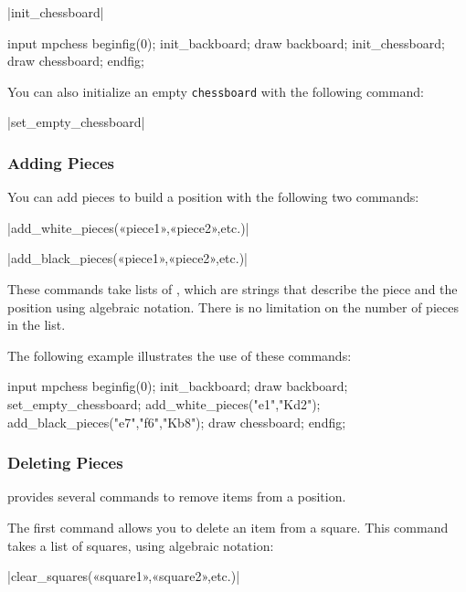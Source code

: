 \documentclass[english]{ltxdoc}
\begin{document}
\commande|init_chessboard|\smallskip

\begin{ExempleMP}
input mpchess
beginfig(0);
init_backboard;
draw backboard;
init_chessboard;
draw chessboard;
endfig;
\end{ExempleMP}

You can also initialize an empty \lstinline+chessboard+ with the following command:

\commande|set_empty_chessboard|\smallskip

\subsubsection{Adding Pieces}

You can add pieces to build a position with the following two commands:

\commande|add_white_pieces(«piece1»,«piece2»,etc.)|\smallskip


\commande|add_black_pieces(«piece1»,«piece2»,etc.)|\smallskip

These commands take lists of \textbf{}, which are strings
that describe the piece and the position using
algebraic notation. There is no limitation on the number of pieces in the list.

The following example illustrates the use of these commands:

\begin{ExempleMP}
input mpchess
beginfig(0);
init_backboard;
draw backboard;
set_empty_chessboard;
add_white_pieces("e1","Kd2");
add_black_pieces("e7","f6","Kb8");
draw chessboard;
endfig;
\end{ExempleMP}


\subsubsection{Deleting Pieces}

\mpchess provides several commands to remove items from a position.

The first command allows you to delete an item from a square. This command takes
a list of squares, using algebraic notation:

\commande|clear_squares(«square1»,«square2»,etc.)|\smallskip
\end{document}
